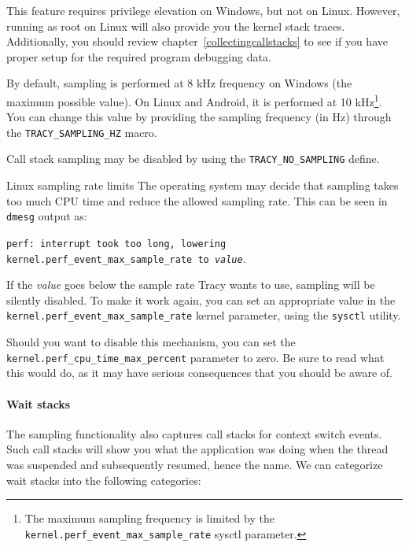 \documentclass[hidelinks,titlepage,a4paper]{article}
\begin{document}
This feature requires privilege elevation on Windows, but not on Linux. However, running as root on Linux will also provide you the kernel stack traces. Additionally, you should review chapter~\ref{collectingcallstacks} to see if you have proper setup for the required program debugging data.

By default, sampling is performed at 8 kHz frequency on Windows (the maximum possible value). On Linux and Android, it is performed at 10 kHz\footnote{The maximum sampling frequency is limited by the \texttt{kernel.perf\_event\_max\_sample\_rate} sysctl parameter.}. You can change this value by providing the sampling frequency (in Hz) through the \texttt{TRACY\_SAMPLING\_HZ} macro.

Call stack sampling may be disabled by using the \texttt{TRACY\_NO\_SAMPLING} define.

\begin{bclogo}[
noborder=true,
couleur=black!5,
logo=\bcbombe
]{Linux sampling rate limits}
The operating system may decide that sampling takes too much CPU time and reduce the allowed sampling rate. This can be seen in \texttt{dmesg} output as:

\texttt{perf: interrupt took too long, lowering kernel.perf\_event\_max\_sample\_rate to \emph{value}}.

If the \emph{value} goes below the sample rate Tracy wants to use, sampling will be silently disabled. To make it work again, you can set an appropriate value in the \texttt{kernel.perf\_event\_max\_sample\_rate} kernel parameter, using the \texttt{sysctl} utility.

Should you want to disable this mechanism, you can set the \texttt{kernel.perf\_cpu\_time\_max\_percent} parameter to zero. Be sure to read what this would do, as it may have serious consequences that you should be aware of.
\end{bclogo}

\paragraph{Wait stacks}
\label{waitstacks}

The sampling functionality also captures call stacks for context switch events. Such call stacks will show you what the application was doing when the thread was suspended and subsequently resumed, hence the name. We can categorize wait stacks into the following categories:
\end{document}
